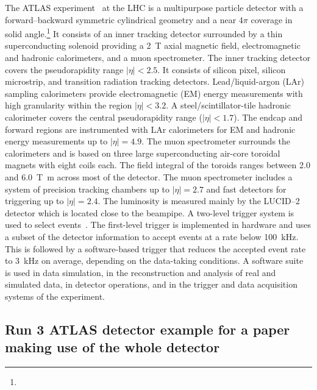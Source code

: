 The ATLAS experiment~\cite{PERF-2007-01,GENR-2019-02} at the LHC is a multipurpose particle detector
with a forward--backward symmetric cylindrical geometry and a near \(4\pi\) coverage in 
solid angle.\footnote{\AtlasCoordFootnote}
It consists of an inner tracking detector surrounded by a thin superconducting solenoid
providing a \qty{2}{\tesla} axial magnetic field, electromagnetic and hadronic calorimeters, and a muon spectrometer.
The inner tracking detector covers the pseudorapidity range \(|\eta| < 2.5\).
It consists of silicon pixel, silicon microstrip, and transition radiation tracking detectors.
Lead/liquid-argon (LAr) sampling calorimeters provide electromagnetic (EM) energy measurements
with high granularity within the region \(|\eta|< 3.2\).
A steel/scintillator-tile hadronic calorimeter covers the central pseudorapidity range (\(|\eta| < 1.7\)).
The endcap and forward regions are instrumented with LAr calorimeters
for EM and hadronic energy measurements up to \(|\eta| = 4.9\).
The muon spectrometer surrounds the calorimeters and is based on
three large superconducting air-core toroidal magnets with eight coils each.
The field integral of the toroids ranges between \num{2.0} and \qty{6.0}{\tesla\metre}
across most of the detector. 
The muon spectrometer includes a system of precision tracking chambers up to \(|\eta| = 2.7\) and fast detectors for triggering up to \(|\eta| = 2.4\).
The luminosity is measured mainly by the LUCID--2 detector which is located close to the beampipe.
A two-level trigger system is used to select events~\cite{TRIG-2016-01}. 
The first-level trigger is implemented in hardware and uses a subset of the detector information
to accept events at a rate below \qty{100}{\kHz}.
This is followed by a software-based trigger that
reduces the accepted event rate to \qty{3}{\kHz} on average,
depending on the data-taking conditions.
A software suite~\cite{SOFT-2022-02} is used in data simulation, in the reconstruction
and analysis of real and simulated data, in detector operations, and in the trigger and data acquisition
systems of the experiment.

\subsection{Run 3 ATLAS detector example for a paper making use of the whole detector}
\label{sec:atlas3b}

